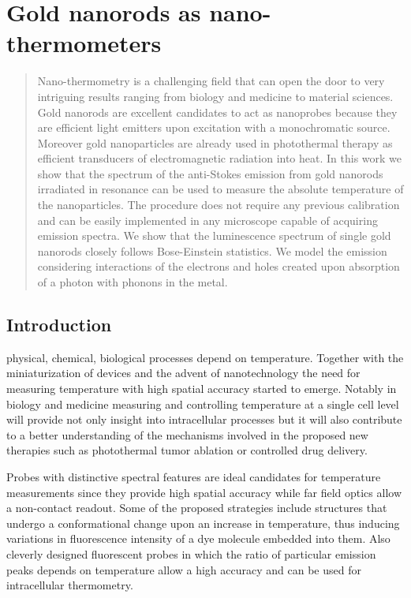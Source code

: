 \chapter{Gold nanorods as nano-thermometers}
\label{ch:AntiStokes}

\begin{abstract}
Nano-thermometry is a challenging field that can open the door to very
intriguing results ranging from biology and medicine to material sciences. Gold
nanorods are excellent candidates to act as nanoprobes because they are
efficient light emitters upon excitation with a monochromatic source. Moreover
gold nanoparticles are already used in photothermal therapy as efficient
transducers of electromagnetic radiation into heat. In this work we show that
the spectrum of the anti-Stokes emission from gold nanorods irradiated in
resonance can be used to measure the absolute temperature of the nanoparticles.
The procedure does not require any previous calibration and can be easily
implemented in any microscope capable of acquiring emission spectra. We show
that the luminescence spectrum of single gold nanorods closely follows
Bose-Einstein statistics. We model the emission considering interactions of the
electrons and holes created upon absorption of a photon with phonons in the
metal.
\end{abstract}

\newpage

\section{Introduction}
 physical, chemical, biological processes depend on temperature.
Together with the miniaturization of devices and the advent of nanotechnology the need
for measuring temperature with high spatial accuracy started to emerge. Notably
in biology\cite{Yang2011a,Hrelescu2010} and medicine\cite{Li2013c} measuring and
controlling temperature at a single cell level will provide not only insight
into intracellular processes but it will also contribute to a better
understanding of the mechanisms involved in the proposed new therapies such as
photothermal tumor ablation\cite{Gobin2007} or controlled drug
delivery\cite{Huang2006,Huo2014}. 

Probes with distinctive spectral features are ideal candidates for temperature
measurements since they provide high spatial accuracy while far field optics
allow a non-contact readout. Some of the proposed strategies include structures
that undergo a conformational change upon an increase in
temperature\cite{Ebrahimi2014}, thus inducing variations in fluorescence
intensity of a dye molecule embedded into them. Also cleverly designed
fluorescent probes\cite{Vetrone2010} in which the ratio of particular emission
peaks depends on temperature allow a high accuracy and can be used for
intracellular thermometry.

